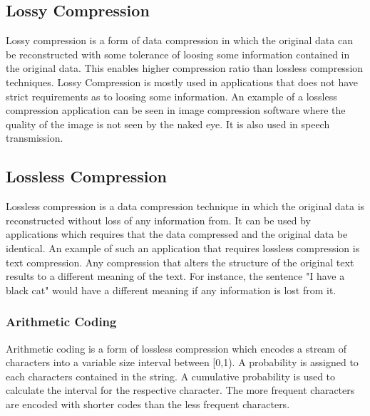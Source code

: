 \subsection{Lossy Compression}

Lossy compression is a form of data compression in which the original data can be reconstructed with some tolerance of loosing some information contained in the original data. This enables higher compression ratio than lossless compression techniques. Lossy Compression is mostly used in applications that does not have strict requirements as to loosing some information. An example of a lossless compression application can be seen in image compression software where the quality of the image is not seen by the naked eye. It is also used in speech transmission. 

\subsection{Lossless Compression}
Lossless compression is a data compression technique in which the original data is reconstructed without loss of any information from. It can be used by applications which requires that the data compressed and the original data be identical. An example of such an application that requires lossless compression is text compression.  Any compression that alters the structure of the original text results to a different meaning of the text. For instance, the sentence "I have a black cat" would have a different meaning if any information is lost from it.



\subsubsection{Arithmetic Coding}

Arithmetic coding is a form of lossless compression which encodes a stream of characters into a variable size interval between [0,1). A probability is assigned to each characters contained in the string. A cumulative probability is used to calculate the interval for the respective character. The more frequent characters are encoded with shorter codes than the less frequent characters. 
